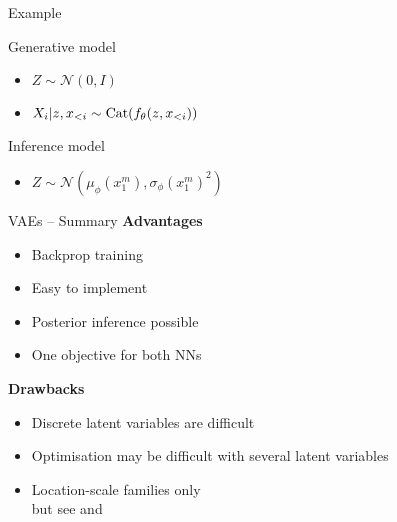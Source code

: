 \begin{frame}{Example}

	Generative model
    	\begin{itemize}
			\item $Z \sim \mathcal N(0, I)$
			\item $X_i | z, x_{<i} \sim \operatorname{Cat}(f_\theta(z, x_{<i}))$\\
    	\end{itemize}
	Inference model
    	\begin{itemize}
			\item $Z \sim \mathcal N(\mu_\phi(x_1^m), \sigma_\phi(x_1^m)^2)$
    	\end{itemize}
	
	
	
\end{frame}



\begin{frame}{VAEs -- Summary}
\textbf{Advantages}
\begin{itemize}
\item Backprop training
\item Easy to implement
\item Posterior inference possible
\item One objective for both NNs
\end{itemize}
\pause
\textbf{Drawbacks}
\begin{itemize}
\item Discrete latent variables are difficult
\item Optimisation may be difficult with several latent variables
\item Location-scale families only\\
but see \citet{RuizEtAl:2016} and \citet{KucukelbirEtAl:2017}
\end{itemize}
\end{frame}
